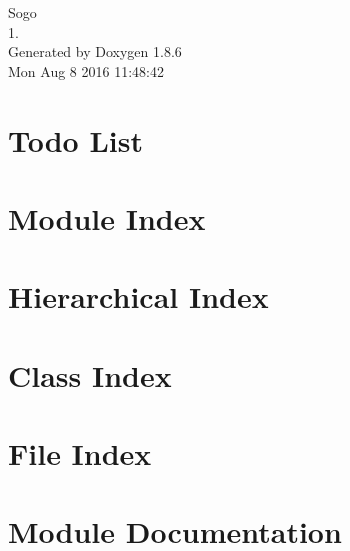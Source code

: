 \documentclass[twoside]{book}
\newcommand{\clearemptydoublepage}{%
  \newpage{\pagestyle{empty}\cleardoublepage}%
}
\begin{document}
\hypersetup{pageanchor=false}
\begin{titlepage}
\vspace*{7cm}
\begin{center}%
{\Large Sogo \\[1ex]\large 1. }\\
\vspace*{1cm}
{\large Generated by Doxygen 1.8.6}\\
\vspace*{0.5cm}
{\small Mon Aug 8 2016 11:48:42}\\
\end{center}
\end{titlepage}
\clearemptydoublepage
\tableofcontents
\clearemptydoublepage
{}
\hypersetup{pageanchor=true}

\chapter{Todo List}
\label{todo}
\hypertarget{todo}{}

\chapter{Module Index}

\chapter{Hierarchical Index}

\chapter{Class Index}

\chapter{File Index}

\chapter{Module Documentation}































\end{document}

